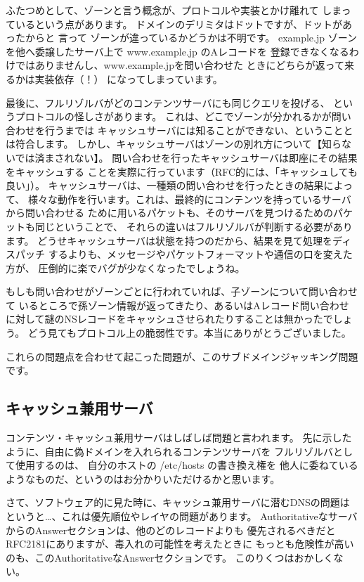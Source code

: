 ふたつめとして、ゾーンと言う概念が、プロトコルや実装とかけ離れて
しまっているという点があります。
ドメインのデリミタはドットですが、ドットがあったからと 言って
ゾーンが違っているかどうかは不明です。
example.jp ゾーンを他へ委譲したサーバ上で www.example.jp のAレコードを
登録できなくなるわけではありませんし、www.example.jpを問い合わせた
ときにどちらが返って来るかは実装依存（！） になってしまっています。


最後に、フルリゾルバがどのコンテンツサーバにも同じクエリを投げる、
というプロトコルの怪しさがあります。
これは、どこでゾーンが分かれるかが問い合わせを行うまでは
キャッシュサーバには知ることができない、ということとは符合します。
しかし、キャッシュサーバはゾーンの別れ方について【知らないでは済まされない】。
問い合わせを行ったキャッシュサーバは即座にその結果をキャッシュする
ことを実際に行っています（RFC的には、「キャッシュしても良い」）。
キャッシュサーバは、一種類の問い合わせを行ったときの結果によって、
様々な動作を行います。これは、最終的にコンテンツを持っているサーバから問い合わせる
ために用いるパケットも、そのサーバを見つけるためのパケットも同じということで、
それらの違いはフルリゾルバが判断する必要があります。
どうせキャッシュサーバは状態を持つのだから、結果を見て処理をディスパッチ
するよりも、メッセージやパケットフォーマットや通信の口を変えた方が、
圧倒的に楽でバグが少なくなったでしょうね。

もしも問い合わせがゾーンごとに行われていれば、子ゾーンについて問い合わせて
いるところで孫ゾーン情報が返ってきたり、あるいはAレコード問い合わせ
に対して謎のNSレコードをキャッシュさせられたりすることは無かったでしょう。
どう見てもプロトコル上の脆弱性です。本当にありがとうございました。

これらの問題点を合わせて起こった問題が、このサブドメインジャッキング問題です。


\subsection{ キャッシュ兼用サーバ }
コンテンツ・キャッシュ兼用サーバはしばしば問題と言われます。
先に示したように、自由に偽ドメインを入れられるコンテンツサーバを
フルリゾルバとして使用するのは、 自分のホストの /etc/hosts の書き換え権を
他人に委ねているようなものだ、というのはお分かりいただけるかと思います。

さて、ソフトウェア的に見た時に、キャッシュ兼用サーバに潜むDNSの問題は
というと…、これは優先順位やレイヤの問題があります。
AuthoritativeなサーバからのAnswerセクションは、他のどのレコードよりも
優先されるべきだとRFC2181にありますが、毒入れの可能性を考えたときに
もっとも危険性が高いのも、このAuthoritativeなAnswerセクションです。
このりくつはおかしくない。

